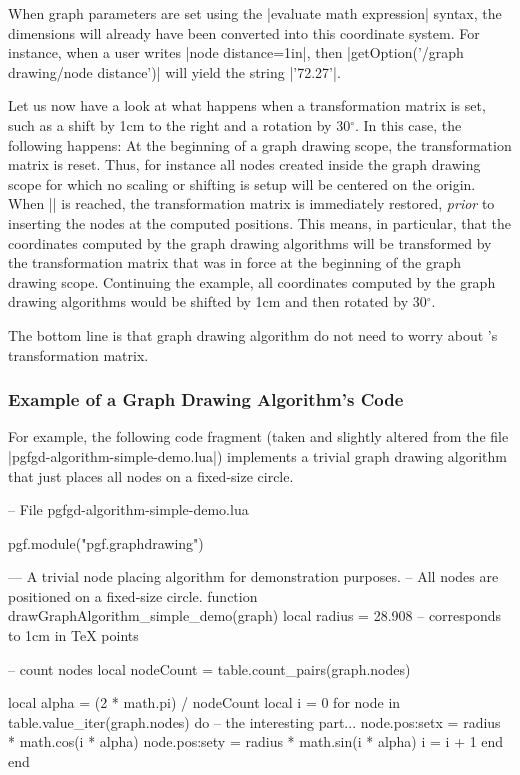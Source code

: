 When graph parameters are set using the |evaluate math expression|
syntax, the dimensions will already have been converted into this
coordinate system. For instance, when a user writes
|node distance=1in|, then |getOption('/graph drawing/node distance')|
will yield the string |'72.27'|.

Let us now have a look at what happens when a transformation matrix is
set, such as a shift by 1cm to the right and a rotation by
30$^\circ$. In this case, the following happens: At the beginning of a
graph drawing scope, the transformation matrix is reset. Thus, for
instance all nodes created inside the graph drawing scope for which no
scaling or shifting is setup will be centered on the origin. When
|\pgfgdendscope| is reached, the transformation matrix is immediately
restored, \emph{prior} to inserting the nodes at the computed
positions. This means, in particular, that the coordinates computed by
the graph drawing algorithms will be transformed by the transformation
matrix that was in force at the beginning of the graph drawing
scope. Continuing the example, all coordinates computed by the graph
drawing algorithms would be shifted by 1cm and then rotated by
30$^\circ$.

The bottom line is that graph drawing algorithm do not need to worry
about \pgfname's transformation matrix.





\subsubsection{Example of a Graph Drawing Algorithm's Code}

For example, the following code fragment (taken and slightly altered
from the file |pgfgd-algorithm-simple-demo.lua|)
implements a trivial graph drawing algorithm that just places all
nodes on a fixed-size circle.  



\begin{codeexample}
-- File pgfgd-algorithm-simple-demo.lua
  
pgf.module("pgf.graphdrawing")

--- A trivial node placing algorithm for demonstration purposes.
-- All nodes are positioned on a fixed-size circle.
function drawGraphAlgorithm_simple_demo(graph)
   local radius = 28.908  -- corresponds to 1cm in TeX points

   -- count nodes
   local nodeCount = table.count_pairs(graph.nodes)

   local alpha = (2 * math.pi) / nodeCount
   local i = 0
   for node in table.value_iter(graph.nodes) do
      -- the interesting part...
      node.pos:set{x = radius * math.cos(i * alpha)}
      node.pos:set{y = radius * math.sin(i * alpha)}
      i = i + 1
   end
end
\end{codeexample}

